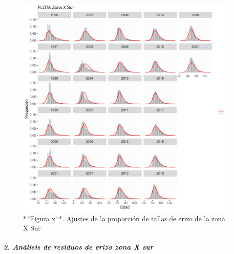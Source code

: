 \documentclass[
]{article}
\begin{document}
\begin{figure}

{\centering \includegraphics{Figuras/ajustesCompFXS-1} 

}

\caption{**Figura x**. Ajustes de la proporción de tallas de erizo de la zona X Sur}\label{fig:ajustesCompFXS}
\end{figure}

\hypertarget{anuxe1lisis-de-residuos-de-erizo-zona-x-sur}{%
\subparagraph{\texorpdfstring{\textbf{\emph{2. Análisis de residuos de
erizo zona X
sur}}}{2. Análisis de residuos de erizo zona X sur}}\label{anuxe1lisis-de-residuos-de-erizo-zona-x-sur}}
\end{document}
